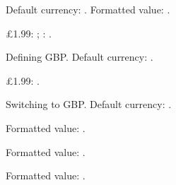 \documentclass[12pt]{article}
\begin{document}
Default currency: \DTLCurrencyCode.
Formatted value: \result. 

£1.99: ;
: . 

Defining GBP.
Default currency: \DTLCurrencyCode. 

£1.99: . 

Switching to GBP.
Default currency: \DTLCurrencyCode. 

Formatted value: \result. 

\renewcommand{\dtlcurrdefaultfmt}{\dtlcurrsuffixfmt} \renewcommand{\DTLcurrCodeOrSymOrChar}[3]{#1} Formatted value: \result. 

Formatted value: \result. 
\end{document}
